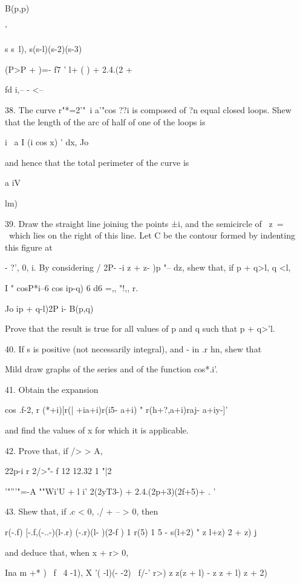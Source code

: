 B(p,p)

 '

s s~l), s(s-l)(s-2)(s-3)

 (P>P + )=- f7 ' l+ ( ) + 2.4.(2 +

fd i,-- - <--

38. The curve r"*=2'"~i a'"cos ??i is composed of ?n equal closed
loops. Shew that the length of the arc of half of one of the loops is

i~ a I (i cos x) ' dx, Jo

and hence that the total perimeter of the curve is

a iV

lm)\

%
%

39. Draw the straight line joiniug the points ±i, and the semicircle
of \ z\ = \ which lies on the right of this line. Let C be the contour
formed by indenting this figure at

- ?', 0, i. By considering / 2P- -i z + z- )p "-- dz, shew that, if p
+ q>l, q <l,

I " cosP*i--6 cos ip-q) 6 d6 =,, "!,, r.

Jo ip + q-l)2P i- B(p,q)

Prove that the result is true for all values of p and q such that p +
q>'l.


40. If s is positive (not necessarily integral), and - in .r hn, shew
that

Mild draw graphs of the series and of the function cos*.i'.

41. Obtain the expansion

cos .f-2, r (*+i)[r(| +ia+i)r(i5- a+i) " r(h+?,a+i)raj- a+iy-]'

and find the values of x for which it is applicable. 

42. Prove that, if /> > A,

22p-i r 2/>"- f 12 12.32 1 "|2

'"'''"=-A ""Wi'U + l i' 2(2yT3-) + 2.4.(2p+3)(2f+5)+ . '


43. Shew that, if .c < 0, ./ + -- > 0, then

r(-.f) [-.f,(-..-)(l-.r) (-.r)(l- )(2-f ) 1 r(5) 1 5 - s(l+2) " z
l+z) 2 + z) j

and deduce that, when x + r> 0,

  Ina m +* ) \ f \ 4   -1), X '( -l)(- -2) \ f/-' r>) z z(z +
l) - z z + l) z + 2)  

